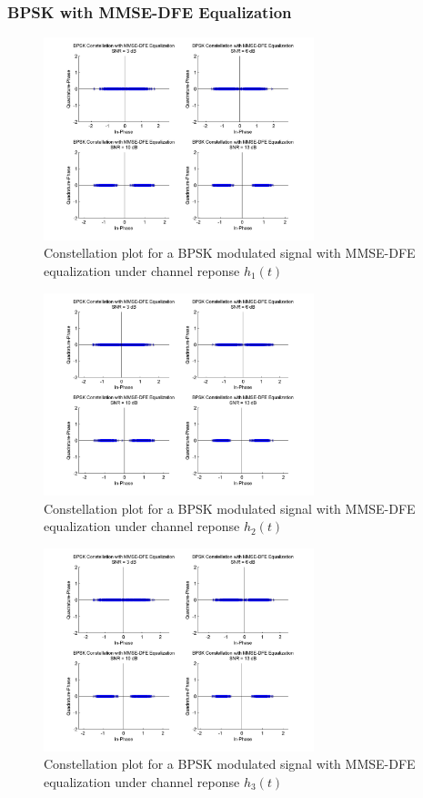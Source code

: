 \documentclass[]{article}
\begin{document}
\subsubsection{BPSK with MMSE-DFE Equalization}

\begin{figure}[H]
\centering
\includegraphics[width=0.7\textwidth]{bpConstMMSEDFE1.jpg}
\caption{Constellation plot for a BPSK modulated signal with MMSE-DFE equalization under channel reponse $h_1(t)$}
\end{figure}

\begin{figure}[H]
\centering
\includegraphics[width=0.7\textwidth]{bpConstMMSEDFE2.jpg}
\caption{Constellation plot for a BPSK modulated signal with MMSE-DFE equalization under channel reponse $h_2(t)$}
\end{figure}

\begin{figure}[H]
\centering
\includegraphics[width=0.7\textwidth]{bpConstMMSEDFE3.jpg}
\caption{Constellation plot for a BPSK modulated signal with MMSE-DFE equalization under channel reponse $h_3(t)$}
\end{figure}
\end{document}
